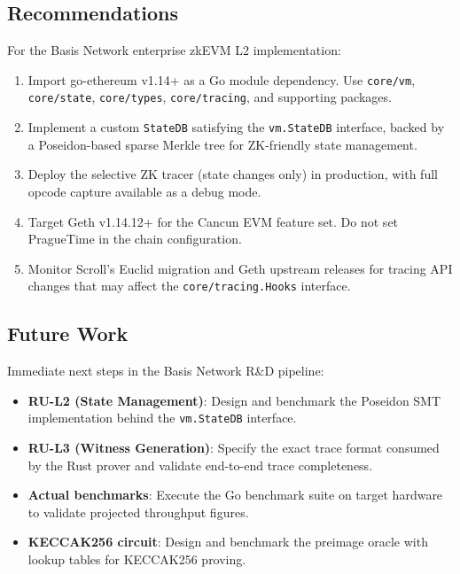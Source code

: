 \subsection{Recommendations}

For the Basis Network enterprise zkEVM L2 implementation:

\begin{enumerate}
  \item Import go-ethereum v1.14+ as a Go module dependency. Use
    \texttt{core/vm}, \texttt{core/state}, \texttt{core/types},
    \texttt{core/tracing}, and supporting packages.

  \item Implement a custom \texttt{StateDB} satisfying the \texttt{vm.StateDB}
    interface, backed by a Poseidon-based sparse Merkle tree for ZK-friendly
    state management.

  \item Deploy the selective ZK tracer (state changes only) in production, with
    full opcode capture available as a debug mode.

  \item Target Geth v1.14.12+ for the Cancun EVM feature set. Do not set
    PragueTime in the chain configuration.

  \item Monitor Scroll's Euclid migration and Geth upstream releases for
    tracing API changes that may affect the \texttt{core/tracing.Hooks}
    interface.
\end{enumerate}

\subsection{Future Work}

Immediate next steps in the Basis Network R\&D pipeline:

\begin{itemize}
  \item \textbf{RU-L2 (State Management)}: Design and benchmark the Poseidon
    SMT implementation behind the \texttt{vm.StateDB} interface.
  \item \textbf{RU-L3 (Witness Generation)}: Specify the exact trace format
    consumed by the Rust prover and validate end-to-end trace completeness.
  \item \textbf{Actual benchmarks}: Execute the Go benchmark suite on target
    hardware to validate projected throughput figures.
  \item \textbf{KECCAK256 circuit}: Design and benchmark the preimage oracle
    with lookup tables for KECCAK256 proving.
\end{itemize}
